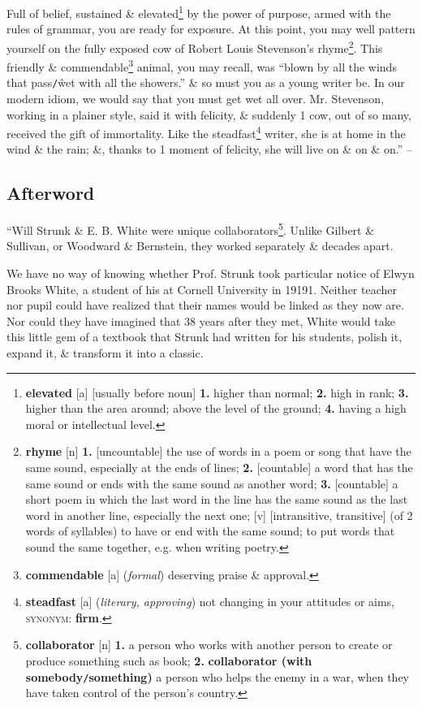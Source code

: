\documentclass[oneside]{book}
\numberwithin{equation}{section}
\begin{document}
Full of belief, sustained \& elevated\footnote{\textbf{elevated} [a] [usually before noun] \textbf{1.} higher than normal; \textbf{2.} high in rank; \textbf{3.} higher than the area around; above the level of the ground; \textbf{4.} having a high moral or intellectual level.} by the power of purpose, armed with the rules of grammar, you are ready for exposure. At this point, you may well pattern yourself on the fully exposed cow of Robert Louis Stevenson's rhyme\footnote{\textbf{rhyme} [n] \textbf{1.} [uncountable] the use of words in a poem or song that have the same sound, especially at the ends of lines; \textbf{2.} [countable] a word that has the same sound or ends with the same sound as another word; \textbf{3.} [countable] a short poem in which the last word in the line has the same sound as the last word in another line, especially the next one; [v] [intransitive, transitive] (of 2 words of syllables) to have or end with the same sound; to put words that sound the same together, e.g. when writing poetry.}. This friendly \& commendable\footnote{\textbf{commendable} [a] (\textit{formal}) deserving praise \& approval.} animal, you may recall, was ``blown by all the winds that pass\texttt{/}\^ wet with all the showers.'' \& so must you as a young writer be. In our modern idiom, we would say that you must get wet all over. Mr. Stevenson, working in a plainer style, said it with felicity, \& suddenly 1 cow, out of so many, received the gift of immortality. Like the steadfast\footnote{\textbf{steadfast} [a] (\textit{literary, approving}) not changing in your attitudes or aims, \textsc{synonym}: \textbf{firm}.} writer, she is at home in the wind \& the rain; \&, thanks to 1 moment of felicity, she will live on \& on \& on.'' -- \cite[Chap. 5, Sect. 21, pp. 100--103]{Strunk_White2019}

\subsection{Afterword}
``Will Strunk \& E. B. White were unique collaborators\footnote{\textbf{collaborator} [n] \textbf{1.} a person who works with another person to create or produce something such as book; \textbf{2.} \textbf{collaborator (with somebody\texttt{/}something)} a person who helps the enemy in a war, when they have taken control of the person's country.}. Unlike Gilbert \& Sullivan, or Woodward \& Bernstein, they worked separately \& decades apart.

We have no way of knowing whether Prof. Strunk took particular notice of Elwyn Brooks White, a student of his at Cornell University in 19191. Neither teacher nor pupil could have realized that their names would be linked as they now are. Nor could they have imagined that 38 years after they met, White would take this little gem of a textbook that Strunk had written for his students, polish it, expand it, \& transform it into a classic.
\end{document}
